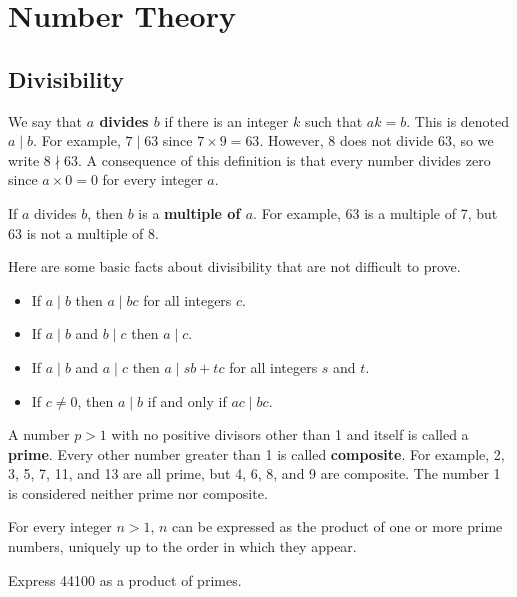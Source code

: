 \chapter{Number Theory}
\section{Divisibility}
We say that \textbf{$a$ divides $b$} if there is an integer $k$ such that $ak = b$. This is denoted $a\;|\;b$. For example, $7\;|\;63$ since $7 \times 9 = 63$. However, 8 does not divide 63, so we write $8 \nmid 63$. A consequence of this definition is that every number divides zero since $a \times 0 = 0$ for every integer $a$.

If $a$ divides $b$, then $b$ is a \textbf{multiple of $a$}. For example, 63 is a multiple of 7, but 63 is not a multiple of 8.

Here are some basic facts about divisibility that are not difficult to prove.
\begin{itemize}
    \item If $a\;|\;b$ then $a\;|\;bc$ for all integers $c$.
    \item If $a\;|\;b$ and $b\;|\;c$ then $a\;|\;c$.
    \item If $a\;|\;b$ and $a\;|\;c$ then $a\;|\;sb+tc$ for all integers $s$ and $t$.
    \item If $c \neq 0$, then $a\;|\;b$ if and only if $ac\;|\;bc$.
\end{itemize}

A number $p > 1$ with no positive divisors other than 1 and itself is called a \textbf{prime}. Every other number greater than 1 is called \textbf{composite}. For example, 2, 3, 5, 7, 11, and 13 are all prime, but 4, 6, 8, and 9 are composite. The number 1 is considered neither prime nor composite.

\begin{theorem}\label{thrm-fundamental-theorem-of-arithmetic}
    For every integer $n > 1$, $n$ can be expressed as the product of one or more prime numbers, uniquely up to the order in which they appear.
\end{theorem}

\begin{exercise}
    Express 44100 as a product of primes.
\end{exercise}

